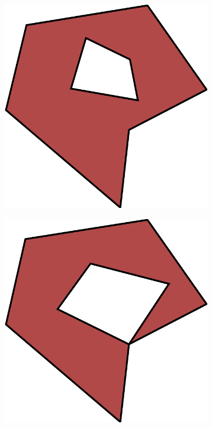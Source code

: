 \begin{figure}[h!]
\centering
\begin{subfigure}{.3\textwidth}
  \centering
  \includegraphics[width=.8\linewidth]{images/polygon_normal.pdf}
  \caption{}
  \label{fig:polygon_normal}
\end{subfigure}
\begin{subfigure}{.3\textwidth}
  \centering
  \includegraphics[width=.8\linewidth]{images/polygon_tangent.pdf}
  \caption{}
  \label{fig:polygon_tangent}
\end{subfigure}
\begin{subfigure}{.3\textwidth}

\end{subfigure}
\end{figure}
